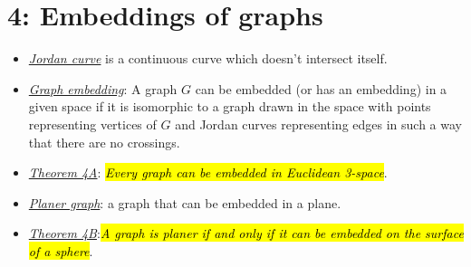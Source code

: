 \documentclass[12pt,a4paper, twocolumn]{article}
\begin{document}
\section*{4: Embeddings of graphs}
\begin{itemize}
		\item \underline{\emph{\color{magenta} Jordan curve}} is a continuous curve which doesn't intersect itself.
		\item \underline{\emph{\color{magenta} Graph embedding}}: A graph $G$ can be embedded (or has an embedding) in a given space if it is isomorphic to a graph drawn in the space with points representing vertices of $G$ and Jordan curves representing edges in such a way that there are no crossings.
		\item \underline{\emph{\color{magenta} Theorem 4A}}: \hl{\emph{Every graph can be embedded in Euclidean 3-space}}.
		\item \underline{\emph{\color{magenta} Planer graph}}: a graph that can be embedded in a plane.
		\item \underline{\emph{\color{magenta} Theorem 4B}}:\hl{\emph{A graph is planer if and only if it can be embedded on the surface of a sphere}}.
\end{itemize}
\end{document}
